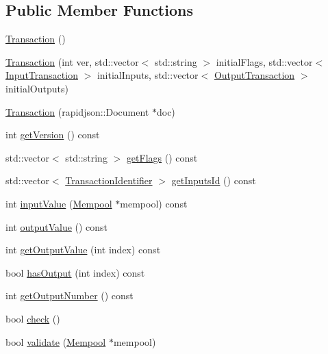 \subsection*{Public Member Functions}
\begin{DoxyCompactItemize}
\item 
\mbox{\hyperlink{classTransaction_ab47005b855d38bc324bb79fd023baa13}{Transaction}} ()
\item 
\mbox{\hyperlink{classTransaction_a5a8028d0c89a04fbc5547806bfad7f4e}{Transaction}} (int ver, std\+::vector$<$ std\+::string $>$ initial\+Flags, std\+::vector$<$ \mbox{\hyperlink{structInputTransaction}{Input\+Transaction}} $>$ initial\+Inputs, std\+::vector$<$ \mbox{\hyperlink{structOutputTransaction}{Output\+Transaction}} $>$ initial\+Outputs)
\item 
\mbox{\hyperlink{classTransaction_a53699ce216993c3350d299aef80635d5}{Transaction}} (rapidjson\+::\+Document $\ast$doc)
\item 
int \mbox{\hyperlink{classTransaction_a133aff45373713e39a7a1317652dc55c}{get\+Version}} () const
\item 
std\+::vector$<$ std\+::string $>$ \mbox{\hyperlink{classTransaction_ab539d43c5af22bed8985473f26e8ac20}{get\+Flags}} () const
\item 
std\+::vector$<$ \mbox{\hyperlink{structTransactionIdentifier}{Transaction\+Identifier}} $>$ \mbox{\hyperlink{classTransaction_a0422efb4aea64a19437c350b04f7de96}{get\+Inputs\+Id}} () const
\item 
int \mbox{\hyperlink{classTransaction_abffdb9f040a484f89920842895d57ed2}{input\+Value}} (\mbox{\hyperlink{classMempool}{Mempool}} $\ast$mempool) const
\item 
int \mbox{\hyperlink{classTransaction_a1feb6131c4b683d6c59073dbf754a634}{output\+Value}} () const
\item 
int \mbox{\hyperlink{classTransaction_a490a7ae3f1520d95f9050ecc7197d1a0}{get\+Output\+Value}} (int index) const
\item 
bool \mbox{\hyperlink{classTransaction_aa2248446ed0d06f64d1685c386189666}{has\+Output}} (int index) const
\item 
int \mbox{\hyperlink{classTransaction_affdce860d7691f68b2e665a8f8d413fd}{get\+Output\+Number}} () const
\item 
bool \mbox{\hyperlink{classTransaction_a46f1d85f39193e516f795c3afe857c90}{check}} ()
\item 
bool \mbox{\hyperlink{classTransaction_afc37b00566ba0dc72e8efa9dd471601d}{validate}} (\mbox{\hyperlink{classMempool}{Mempool}} $\ast$mempool)

\end{DoxyCompactItemize}

